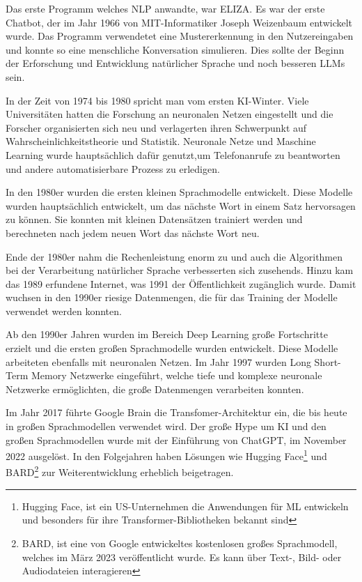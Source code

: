 Das erste Programm welches \acrshort{NLP} anwandte, war ELIZA. Es war der erste Chatbot, der im Jahr 1966 von MIT-Informatiker Joseph Weizenbaum entwickelt wurde. Das Programm verwendetet eine Mustererkennung in den Nutzereingaben und konnte so eine menschliche Konversation simulieren. Dies sollte der Beginn der Erforschung und Entwicklung natürlicher Sprache und noch besseren LLMs sein.\vspace{0.2cm}

In der Zeit von 1974 bis 1980 spricht man vom \glqq ersten KI-Winter\grqq . Viele Universitäten hatten die Forschung an neuronalen Netzen eingestellt und die Forscher organisierten sich neu und verlagerten ihren Schwerpunkt auf Wahrscheinlichkeitstheorie und Statistik. Neuronale Netze und Maschine Learning wurde hauptsächlich dafür genutzt,um Telefonanrufe zu beantworten und andere automatisierbare Prozess zu erledigen.\vspace{0.2cm}

In den 1980er wurden die ersten kleinen Sprachmodelle entwickelt. Diese Modelle wurden hauptsächlich entwickelt, um das nächste Wort in einem Satz hervorsagen zu können. Sie konnten mit kleinen Datensätzen trainiert werden und berechneten nach jedem neuen Wort das nächste Wort neu.\vspace{0.2cm}

Ende der 1980er nahm die Rechenleistung enorm zu und auch die Algorithmen bei der Verarbeitung natürlicher Sprache verbesserten sich zusehends. Hinzu kam das 1989 erfundene Internet, was 1991 der Öffentlichkeit zugänglich wurde. Damit wuchsen in den 1990er riesige Datenmengen, die für das Training der Modelle verwendet werden konnten.\vspace{0.2cm}

Ab den 1990er Jahren wurden im Bereich Deep Learning große Fortschritte erzielt und die ersten großen Sprachmodelle wurden entwickelt. Diese Modelle arbeiteten ebenfalls mit neuronalen Netzen. Im Jahr 1997 wurden Long Short-Term Memory Netzwerke eingeführt, welche tiefe und komplexe neuronale Netzwerke ermöglichten, die große Datenmengen verarbeiten konnten.\vspace{0.2cm}

Im Jahr 2017 führte Google Brain die Transfomer-Architektur ein, die bis heute in großen Sprachmodellen verwendet wird. Der große Hype um KI und den großen Sprachmodellen wurde mit der Einführung von ChatGPT, im November 2022 ausgelöst. In den Folgejahren haben Lösungen wie Hugging Face\footnote{Hugging Face, ist ein US-Unternehmen die Anwendungen für ML entwickeln und besonders für ihre Transformer-Bibliotheken bekannt sind} und BARD\footnote{BARD, ist eine von Google entwickeltes kostenlosen großes Sprachmodell, welches im März 2023 veröffentlicht wurde. Es kann über Text-, Bild- oder Audiodateien interagieren} zur Weiterentwicklung erheblich beigetragen.


